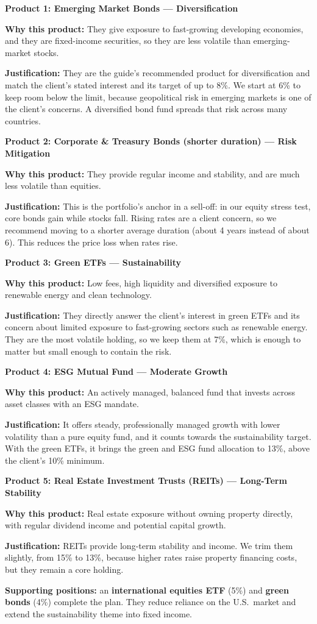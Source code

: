 \documentclass[11pt]{article}
\newcommand{\product}[4]{%
  \begin{tcolorbox}[enhanced, colback=boxgray, frame hidden, arc=2mm,
      borderline west={1.2mm}{0pt}{navy}, left=5mm, right=4mm, top=2.5mm,
      bottom=2.5mm, breakable]
    {\bfseries\color{navy}#1}\hfill{\small\badge{#2}}\par\smallskip
    \textbf{Why this product:} #3\par\smallskip
    \textbf{Justification:} #4
  \end{tcolorbox}}
\begin{document}
\product{Product 1: Emerging Market Bonds --- Diversification}{6\%}{%
They give exposure to fast-growing developing economies, and they are
fixed-income securities, so they are less volatile than emerging-market
stocks.}{%
They are the guide's recommended product for diversification and match the
client's stated interest and its target of up to 8\%. We start at 6\% to keep
room below the limit, because geopolitical risk in emerging markets is one of
the client's concerns. A diversified bond fund spreads that risk across many
countries.}

\product{Product 2: Corporate \& Treasury Bonds (shorter duration) --- Risk
Mitigation}{22\%}{%
They provide regular income and stability, and are much less volatile than
equities.}{%
This is the portfolio's anchor in a sell-off: in our equity stress test,
core bonds gain while stocks fall. Rising rates are a client concern, so we
recommend moving to a shorter average duration (about 4 years instead of
about 6). This reduces the price loss when rates rise.}

\product{Product 3: Green ETFs --- Sustainability}{7\%}{%
Low fees, high liquidity and diversified exposure to renewable energy and
clean technology.}{%
They directly answer the client's interest in green ETFs and its concern about
limited exposure to fast-growing sectors such as renewable energy. They are
the most volatile holding, so we keep them at 7\%, which is enough to matter
but small enough to contain the risk.}

\product{Product 4: ESG Mutual Fund --- Moderate Growth}{6\%}{%
An actively managed, balanced fund that invests across asset classes with an
ESG mandate.}{%
It offers steady, professionally managed growth with lower volatility than a
pure equity fund, and it counts towards the sustainability target. With the
green ETFs, it brings the green and ESG fund allocation to 13\%, above the
client's 10\% minimum.}

\product{Product 5: Real Estate Investment Trusts (REITs) --- Long-Term
Stability}{13\%}{%
Real estate exposure without owning property directly, with regular dividend
income and potential capital growth.}{%
REITs provide long-term stability and income. We trim them slightly, from
15\% to 13\%, because higher rates raise property financing costs, but they
remain a core holding.}

\textbf{Supporting positions:} an \textbf{international equities ETF} (5\%)
and \textbf{green bonds} (4\%) complete the plan. They reduce reliance on the
U.S.\ market and extend the sustainability theme into fixed income.
\end{document}
